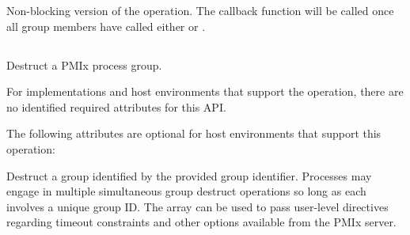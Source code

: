 Non-blocking version of the  operation. The callback function will be called once all group members have called either  or .

\subsection{}

\summary

Destruct a \ac{PMIx} process group.

\format


\begin{arglist}
\end{arglist}

\returnsimple

\reqattrstart
For implementations and host environments that support the operation, there are no identified required
attributes for this \ac{API}.
\reqattrend

\optattrstart
The following attributes are optional for host environments that support this operation:


\optattrend

\descr

Destruct a group identified by the provided group identifier. Processes may engage in multiple simultaneous group destruct operations so long as each involves a unique group ID. The  array can be used to pass user-level directives regarding timeout constraints and other options available from the \ac{PMIx} server.

